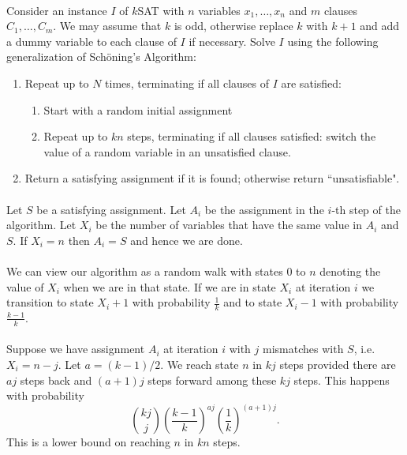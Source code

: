 \documentclass[letterpaper,12pt,oneside,onecolumn]{article}
\begin{document}
	\paragraph{}
	Consider an instance $I$ of $k$SAT with $n$ variables $x_1,\dots,x_n$ and $m$ clauses $C_1, \dots, C_m$. We may assume that $k$ is odd, otherwise replace $k$ with $k+1$ and add a dummy variable to each clause of $I$ if necessary. Solve $I$ using the following generalization of Sch\"oning's Algorithm:
	\begin{enumerate}
		\item Repeat up to $N$ times, terminating if all clauses of $I$ are satisfied:
		\begin{enumerate}
			\item Start with a random initial assignment
			\item Repeat up to $kn$ steps, terminating if all clauses satisfied: switch the value of a random variable in an unsatisfied clause.
		\end{enumerate}
		\item Return a satisfying assignment if it is found; otherwise return ``unsatisfiable".
	\end{enumerate}
	\paragraph{}
	Let $S$ be a satisfying assignment. Let $A_i$ be the assignment in the $i$-th step of the algorithm. Let $X_i$ be the number of variables that have the same value in $A_i$ and $S$. If $X_i = n$ then $A_i = S$ and hence we are done.
	\paragraph{}
	We can view our algorithm as a random walk with states $0$ to $n$ denoting the value of $X_i$ when we are in that state. If we are in state $X_i$ at iteration $i$ we transition to state $X_i+1$ with probability $\frac{1}{k}$ and to state $X_i-1$ with probability $\frac{k-1}{k}$.
	\paragraph{}
	Suppose we have assignment $A_i$ at iteration $i$ with $j$ mismatches with $S$, i.e. $X_i = n-j$. Let $a = (k-1)/2$. We reach state $n$ in $kj$ steps provided there are $aj$ steps back and $(a+1)j$ steps forward among these $kj$ steps. This happens with probability
	$${kj\choose j}(\frac{k-1}{k})^{aj}(\frac{1}{k})^{(a+1)j}.$$
	This is a lower bound on reaching $n$ in $kn$ steps.
\end{document}

